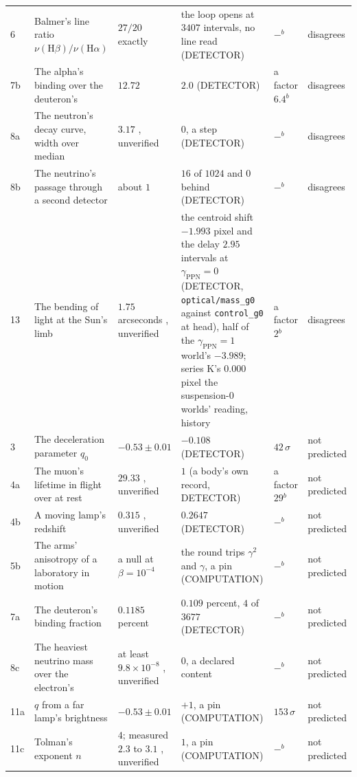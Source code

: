 {\begin{longtable}{L{0.3in}L{1.35in}L{1.4in}L{1.5in}L{0.55in}L{0.75in}}
6 & Balmer's line ratio $\nu(\mathrm{H}\beta)/\nu(\mathrm{H}\alpha)$ & $27/20$ exactly \cite{nist} & the loop opens at $3407$ intervals, no line read (DETECTOR) & $-$$^{b}$ & disagrees \\
7b & The alpha's binding over the deuteron's & $12.72$ \cite{ame2020} & $2.0$ (DETECTOR) & a factor $6.4$$^{b}$ & disagrees \\
8a & The neutron's decay curve, width over median & $3.17$ \cite{gonzalez2021}, unverified & $0$, a step (DETECTOR) & $-$$^{b}$ & disagrees \\
8b & The neutrino's passage through a second detector & about $1$ & $16$ of $1024$ and $0$ behind (DETECTOR) & $-$$^{b}$ & disagrees \\
13 & The bending of light at the Sun's limb & $1.75$ arcseconds \cite{dyson1920}, unverified & the centroid shift $-1.993$ pixel and the delay $2.95$ intervals at $\gamma_{\mathrm{PPN}} = 0$ (DETECTOR, \texttt{optical/mass\_g0} against \texttt{control\_g0} at head), half of the $\gamma_{\mathrm{PPN}} = 1$ world's $-3.989$; series K's $0.000$ pixel the suspension-$0$ worlds' reading, history & a factor $2$$^{b}$ & disagrees \\
3 & The deceleration parameter $q_0$ & $-0.53 \pm 0.01$ \cite{planck2018} & $-0.108$ (DETECTOR) & $42\,\sigma$ & not predicted \\
4a & The muon's lifetime in flight over at rest & $29.33$ \cite{bailey1977}, unverified & $1$ (a body's own record, DETECTOR) & a factor $29$$^{b}$ & not predicted \\
4b & A moving lamp's redshift & $0.315$ \cite{botermann2014}, unverified & $0.2647$ (DETECTOR) & $-$$^{b}$ & not predicted \\
5b & The arms' anisotropy of a laboratory in motion & a null at $\beta = 10^{-4}$ \cite{michelson1887} & the round trips $\gamma^2$ and $\gamma$, a pin (COMPUTATION) & $-$$^{b}$ & not predicted \\
7a & The deuteron's binding fraction & $0.1185$ percent \cite{ame2020} & $0.109$ percent, $4$ of $3677$ (DETECTOR) & $-$$^{b}$ & not predicted \\
8c & The heaviest neutrino mass over the electron's & at least $9.8 \times 10^{-8}$ \cite{pdg2024,katrin2022}, unverified & $0$, a declared content & $-$$^{b}$ & not predicted \\
11a & $q$ from a far lamp's brightness & $-0.53 \pm 0.01$ \cite{planck2018} & $+1$, a pin (COMPUTATION) & $153\,\sigma$ & not predicted \\
11c & Tolman's exponent $n$ & $4$; measured $2.3$ to $3.1$ \cite{lubin2001}, unverified & $1$, a pin (COMPUTATION) & $-$$^{b}$ & not predicted \\
\end{longtable}}

